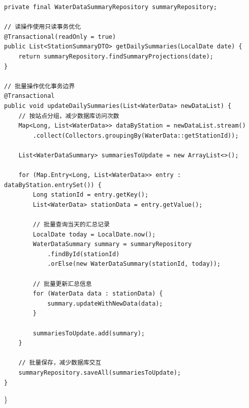 \begin{verbatim}
private final WaterDataSummaryRepository summaryRepository;

// 读操作使用只读事务优化
@Transactional(readOnly = true)
public List<StationSummaryDTO> getDailySummaries(LocalDate date) {
    return summaryRepository.findSummaryProjections(date);
}

// 批量操作优化事务边界
@Transactional
public void updateDailySummaries(List<WaterData> newDataList) {
    // 按站点分组，减少数据库访问次数
    Map<Long, List<WaterData>> dataByStation = newDataList.stream()
        .collect(Collectors.groupingBy(WaterData::getStationId));
    
    List<WaterDataSummary> summariesToUpdate = new ArrayList<>();
    
    for (Map.Entry<Long, List<WaterData>> entry : dataByStation.entrySet()) {
        Long stationId = entry.getKey();
        List<WaterData> stationData = entry.getValue();
        
        // 批量查询当天的汇总记录
        LocalDate today = LocalDate.now();
        WaterDataSummary summary = summaryRepository
            .findById(stationId)
            .orElse(new WaterDataSummary(stationId, today));
        
        // 批量更新汇总信息
        for (WaterData data : stationData) {
            summary.updateWithNewData(data);
        }
        
        summariesToUpdate.add(summary);
    }
    
    // 批量保存，减少数据库交互
    summaryRepository.saveAll(summariesToUpdate);
}
\end{verbatim}

\}

